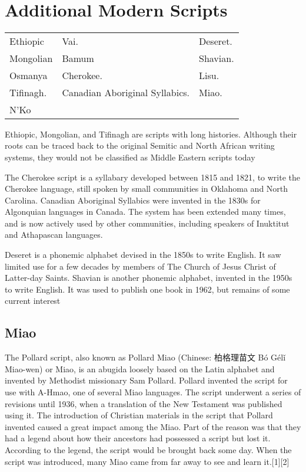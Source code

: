 ^^A
^^A
^^A
^^A
^^A
^^A
^^A
^^A
^^A
^^A
^^A

\section{Additional Modern Scripts}

\begin{center}
\begin{tabular}{lp{5cm}l}
Ethiopic &Vai. &Deseret.\\
Mongolian &Bamum &Shavian.\\
Osmanya   &Cherokee. &Lisu.\\
Tifinagh.  &Canadian Aboriginal Syllabics. &Miao.\\
N’Ko&&\\
\end{tabular}
\end{center}

Ethiopic, Mongolian, and Tifinagh are scripts with long histories. Although their roots can
be traced back to the original Semitic and North African writing systems, they would not
be classified as Middle Eastern scripts today

The Cherokee script is a syllabary developed between 1815 and 1821, to write the Cherokee
language, still spoken by small communities in Oklahoma and North Carolina. Canadian
Aboriginal Syllabics were invented in the 1830s for Algonquian languages in Canada. The
system has been extended many times, and is now actively used by other communities, including speakers of Inuktitut and Athapascan languages.

Deseret is a phonemic alphabet devised in the 1850s to write English. It saw limited use for
a few decades by members of The Church of Jesus Christ of Latter-day Saints. Shavian is
another phonemic alphabet, invented in the 1950s to write English. It was used to publish
one book in 1962, but remains of some current interest

\subsection{Miao}

The Pollard script, also known as Pollard Miao (Chinese: 柏格理苗文 Bó Gélǐ Miao-wen) or Miao, is an abugida loosely based on the Latin alphabet and invented by Methodist missionary Sam Pollard. Pollard invented the script for use with A-Hmao, one of several Miao languages. The script underwent a series of revisions until 1936, when a translation of the New Testament was published using it. The introduction of Christian materials in the script that Pollard invented caused a great impact among the Miao. Part of the reason was that they had a legend about how their ancestors had possessed a script but lost it. According to the legend, the script would be brought back some day. When the script was introduced, many Miao came from far away to see and learn it.[1][2]

